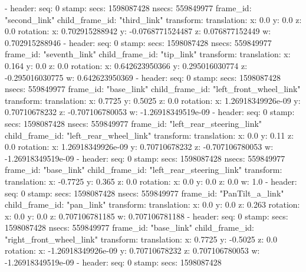   - 
    header: 
      seq: 0
      stamp: 
        secs: 1598087428
        nsecs: 559849977
      frame_id: "second_link"
    child_frame_id: "third_link"
    transform: 
      translation: 
        x: 0.0
        y: 0.0
        z: 0.0
      rotation: 
        x: 0.702915288942
        y: -0.0768771524487
        z: 0.076877152449
        w: 0.702915288946
  - 
    header: 
      seq: 0
      stamp: 
        secs: 1598087428
        nsecs: 559849977
      frame_id: "seventh_link"
    child_frame_id: "tip_link"
    transform: 
      translation: 
        x: 0.164
        y: 0.0
        z: 0.0
      rotation: 
        x: 0.642623950366
        y: 0.295016030774
        z: -0.295016030775
        w: 0.642623950369
  - 
    header: 
      seq: 0
      stamp: 
        secs: 1598087428
        nsecs: 559849977
      frame_id: "base_link"
    child_frame_id: "left_front_wheel_link"
    transform: 
      translation: 
        x: 0.7725
        y: 0.5025
        z: 0.0
      rotation: 
        x: 1.26918349926e-09
        y: 0.70710678232
        z: -0.707106780053
        w: -1.26918349519e-09
  - 
    header: 
      seq: 0
      stamp: 
        secs: 1598087428
        nsecs: 559849977
      frame_id: "left_rear_steering_link"
    child_frame_id: "left_rear_wheel_link"
    transform: 
      translation: 
        x: 0.0
        y: 0.11
        z: 0.0
      rotation: 
        x: 1.26918349926e-09
        y: 0.70710678232
        z: -0.707106780053
        w: -1.26918349519e-09
  - 
    header: 
      seq: 0
      stamp: 
        secs: 1598087428
        nsecs: 559849977
      frame_id: "base_link"
    child_frame_id: "left_rear_steering_link"
    transform: 
      translation: 
        x: -0.7725
        y: 0.365
        z: 0.0
      rotation: 
        x: 0.0
        y: 0.0
        z: 0.0
        w: 1.0
  - 
    header: 
      seq: 0
      stamp: 
        secs: 1598087428
        nsecs: 559849977
      frame_id: "PanTilt_a_link"
    child_frame_id: "pan_link"
    transform: 
      translation: 
        x: 0.0
        y: 0.0
        z: 0.263
      rotation: 
        x: 0.0
        y: 0.0
        z: 0.707106781185
        w: 0.707106781188
  - 
    header: 
      seq: 0
      stamp: 
        secs: 1598087428
        nsecs: 559849977
      frame_id: "base_link"
    child_frame_id: "right_front_wheel_link"
    transform: 
      translation: 
        x: 0.7725
        y: -0.5025
        z: 0.0
      rotation: 
        x: -1.26918349926e-09
        y: 0.70710678232
        z: 0.707106780053
        w: -1.26918349519e-09
  - 
    header: 
      seq: 0
      stamp: 
        secs: 1598087428
